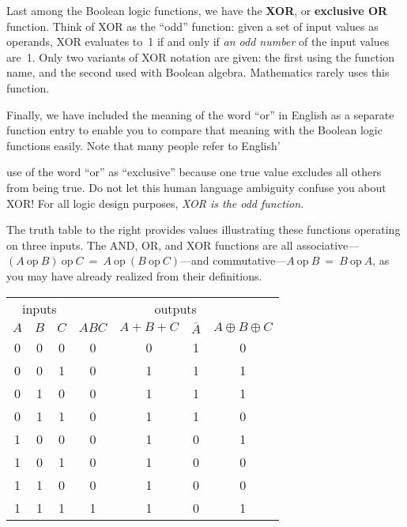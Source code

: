 Last among the Boolean logic functions, we have the
{\bf XOR}, or {\bf exclusive OR} function.
Think of XOR as the ``odd'' function: given a set of input values as
operands, XOR evaluates to~1 if and only if {\em an odd number} of
the input values are~1.  Only two variants of XOR notation are given:
the first using the function name, and the second used with Boolean
algebra.  Mathematics rarely uses this function.

Finally, we have included the meaning of the word ``or'' in English as
a separate function entry to enable you to compare that meaning
with the Boolean logic functions easily.  Note that many people refer
to English'\linebreak\mpdone

\begin{minipage}{3in}
use of the word ``or'' as ``exclusive'' because one
true value excludes all others from being true.  Do not let this 
human language ambiguity confuse you about XOR!  For all logic design
purposes, {\em XOR is the odd function}.\mpline\vspace{2pt}

The truth table to the right provides values illustrating these functions operating
on three inputs.  The AND, OR, and XOR functions are all 
associative---$(A~\mbox{op}~B)~\mbox{op}~C~=~A~\mbox{op}~(B~\mbox{op}~C)$---and
commutative---$A~\mbox{op}~B~=~B~\mbox{op}~A$,
as you may have already realized from their definitions.
\end{minipage}\hspace{.25in}%
\begin{minipage}{3.25in}\vspace{20pt}
\begin{tabular}{ccc|cccc}
\multicolumn{3}{c|}{inputs}& \multicolumn{4}{c}{outputs}\\
$A$& $B$& $C$& $ABC$& $A+B+C$& $\overline{A}$& $A\oplus{B}\oplus{C}$\\ \hline
0& 0& 0& 0& 0& 1& 0\\
0& 0& 1& 0& 1& 1& 1\\
0& 1& 0& 0& 1& 1& 1\\
0& 1& 1& 0& 1& 1& 0\\
1& 0& 0& 0& 1& 0& 1\\
1& 0& 1& 0& 1& 0& 0\\
1& 1& 0& 0& 1& 0& 0\\
1& 1& 1& 1& 1& 0& 1\\
\end{tabular}
\end{minipage}

